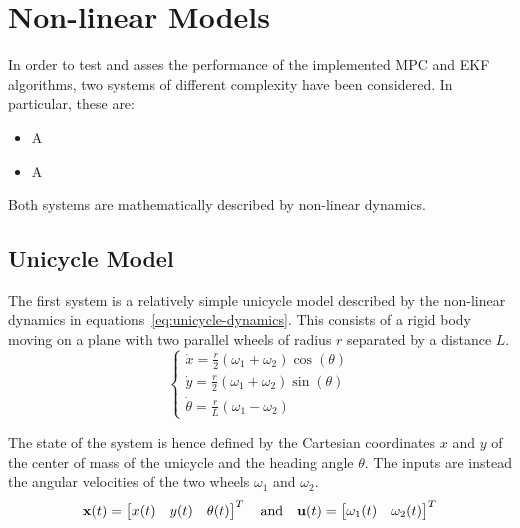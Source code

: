\documentclass[../main.tex]{subfiles}
\begin{document}
\section{Non-linear Models}\label{sec:models}

In order to test and asses the performance of the implemented MPC and EKF
algorithms, two systems of different complexity have been considered. In particular, these are:

\begin{itemize}
	\item A 
	\item A 
\end{itemize}

Both systems are mathematically described by non-linear dynamics.

\subsection{Unicycle Model}

The first system is a relatively simple unicycle model described by the
non-linear dynamics in equations~\eqref{eq:unicycle-dynamics}.
This consists of a rigid body moving on a plane with two parallel wheels of radius
$r$ separated by a distance $L$.
\begin{equation}\label{eq:unicycle-dynamics}
  \begin{cases}
	  \dot{x} = \frac{r}{2} (\omega_1 + \omega_2) \cos(\theta)\\
	  \dot{y} = \frac{r}{2} (\omega_1 + \omega_2) \sin(\theta)\\
	  \dot{\theta} = \frac{r}{L} (\omega_1 - \omega_2)
  \end{cases}
\end{equation}

The state of the system is hence defined by the Cartesian coordinates $x$ and
$y$ of the center of mass of the unicycle and the heading angle $\theta$. The
inputs are instead the angular velocities of the two wheels $\omega_1$ and
$\omega_2$.
\begin{equation*}
	\mathbf{x}(t) = \begin{bmatrix} x(t) & y(t) & \theta(t) \end{bmatrix}^T
	\quad \text{and} \quad
	\mathbf{u}(t) = \begin{bmatrix} \omega_1(t) & \omega_2(t) \end{bmatrix}^T
\end{equation*}
\end{document}
